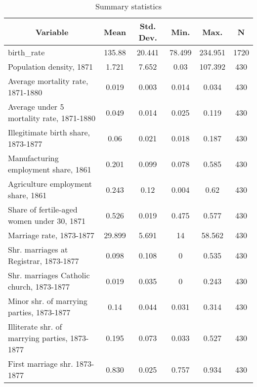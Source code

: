 
\begin{table}[htbp]\centering \caption{Summary statistics \label{sumstat}}
\begin{tabular}{l c c c c c}\hline\hline
\multicolumn{1}{c}{\textbf{Variable}} & \textbf{Mean}
 & \textbf{Std. Dev.}& \textbf{Min.} &  \textbf{Max.} & \textbf{N}\\ \hline
birth\_rate & 135.88 & 20.441 & 78.499 & 234.951 & 1720\\
Population density, 1871 & 1.721 & 7.652 & 0.03 & 107.392 & 430\\
Average mortality rate, 1871-1880 & 0.019 & 0.003 & 0.014 & 0.034 & 430\\
Average under 5 mortality rate, 1871-1880 & 0.049 & 0.014 & 0.025 & 0.119 & 430\\
Illegitimate birth share, 1873-1877 & 0.06 & 0.021 & 0.018 & 0.187 & 430\\
Manufacturing employment share, 1861 & 0.201 & 0.099 & 0.078 & 0.585 & 430\\
Agriculture employment share, 1861 & 0.243 & 0.12 & 0.004 & 0.62 & 430\\
Share of fertile-aged women under 30, 1871 & 0.526 & 0.019 & 0.475 & 0.577 & 430\\
Marriage rate, 1873-1877 & 29.899 & 5.691 & 14 & 58.562 & 430\\
Shr. marriages at Registrar, 1873-1877 & 0.098 & 0.108 & 0 & 0.535 & 430\\
Shr. marriages Catholic church, 1873-1877 & 0.019 & 0.035 & 0 & 0.243 & 430\\
Minor shr. of marrying parties, 1873-1877 & 0.14 & 0.044 & 0.031 & 0.314 & 430\\
Illiterate shr. of marrying parties, 1873-1877 & 0.195 & 0.073 & 0.033 & 0.527 & 430\\
First marriage shr. 1873-1877 & 0.830 & 0.025 & 0.757 & 0.934 & 430\\
\hline\end{tabular}
\end{table}
